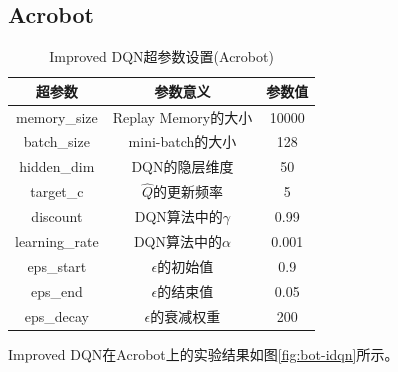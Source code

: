 \documentclass[a4paper,UTF8]{article}
\theoremstyle{definition}
\begin{document}
\subsection*{Acrobot}

\begin{table}[H]
	\centering
	\begin{tabular}{ccc}
		\toprule
		超参数 & 参数意义 & 参数值 \\
		\midrule
		memory\_size & Replay Memory的大小 & 10000 \\
		batch\_size & mini-batch的大小 & 128 \\
		hidden\_dim & DQN的隐层维度 & 50 \\
		target\_c & $\hat{Q}$的更新频率 & 5 \\
		discount & DQN算法中的$\gamma$ & 0.99 \\
		learning\_rate & DQN算法中的$\alpha$ & 0.001 \\
		eps\_start & $\epsilon$的初始值 & 0.9 \\
		eps\_end & $\epsilon$的结束值 & 0.05 \\
		eps\_decay & $\epsilon$的衰减权重 & 200 \\
		\bottomrule
	\end{tabular}
	\caption{Improved DQN超参数设置(Acrobot)}\label{tab:bot-idqn}
\end{table}

Improved DQN在Acrobot上的实验结果如图\ref{fig:bot-idqn}所示。
\end{document}
